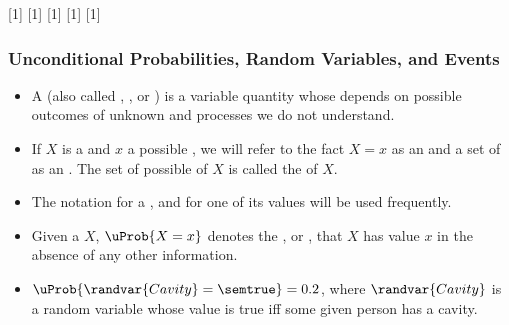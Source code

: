 \documentclass[notes,mh]{mikoslides}
\begin{document}
\begin{module}[id=unconditional-prob]

[1]{}
[1]{}
[1]{}
[1]{}
[1]{\prefix[p=800]}

\begin{frame}
  \frametitle{Unconditional Probabilities, Random Variables, and Events}
  \begin{itemize}
    \item 
      \begin{definition}
        A  (also called
        ,
        , or
        ) is a variable
        quantity whose  depends on possible outcomes of unknown
         and processes we do not
        understand.
      \end{definition}
  \item
    \begin{definition} 
      If $X$ is a  and $x$ a possible , we will
      refer to the fact $X = x$ as an  and a set of  as an
      . The set of possible  of $X$ is called the
       of $X$.
    \end{definition}
  \item The notation  for a , and
     for one of its values will be used frequently. 
  \item
    \begin{definition}
      Given a  $X$, $\uProb{X = x}$ denotes the
      , or
      , that $X$ has value $x$ in the absence of any
      other information.
    \end{definition}
  \item
    \begin{module}[id=cavity-ex]
      \begin{example}
        $\uProb{\randvar{Cavity}=\semtrue} = 0.2$, where $\randvar{Cavity}$ is a random
        variable whose value is true iff some given person has a cavity.
      \end{example}
    \end{module}
  \end{itemize}
\end{frame}


\end{module}
\end{document}
